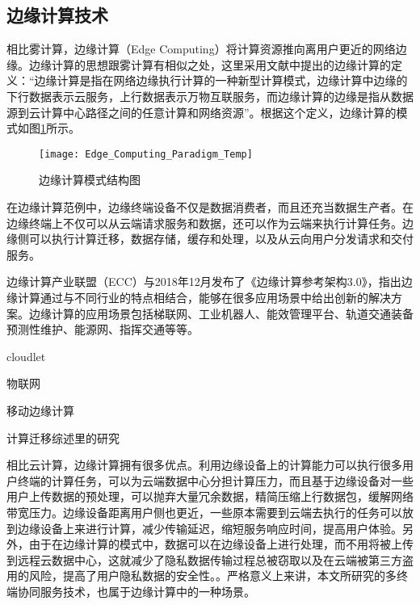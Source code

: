\subsection{边缘计算技术}

相比雾计算，边缘计算（Edge Computing）将计算资源推向离用户更近的网络边缘。边缘计算的思想跟雾计算有相似之处，这里采用文献\cite{施巍松2017边缘计算}中提出的边缘计算的定义：“边缘计算是指在网络边缘执行计算的一种新型计算模式，边缘计算中边缘的下行数据表示云服务，上行数据表示万物互联服务，而边缘计算的边缘是指从数据源到云计算中心路径之间的任意计算和网络资源”。根据这个定义，边缘计算的模式如图\ref{fig:edge_computing_paradigm}所示\cite{shi2016edge}。


\begin{figure}[!htbp]
    \centering
    \texttt{[image: Edge\_Computing\_Paradigm\_Temp]}
    \caption{边缘计算模式结构图}
    \label{fig:edge_computing_paradigm}
\end{figure}

在边缘计算范例中，边缘终端设备不仅是数据消费者，而且还充当数据生产者。在边缘终端上不仅可以从云端请求服务和数据，还可以作为云端来执行计算任务。边缘侧可以执行计算迁移，数据存储，缓存和处理，以及从云向用户分发请求和交付服务\cite{shi2016edge}。

边缘计算产业联盟（ECC）与2018年12月发布了《边缘计算参考架构3.0》\cite{边缘计算架构2018}，指出边缘计算通过与不同行业的特点相结合，能够在很多应用场景中给出创新的解决方案。边缘计算的应用场景包括梯联网、工业机器人、能效管理平台、轨道交通装备预测性维护、能源网、指挥交通等等。

cloudlet

物联网

移动边缘计算

计算迁移综述里的研究

相比云计算，边缘计算拥有很多优点\cite{赵梓铭2018边缘计算}。利用边缘设备上的计算能力可以执行很多用户终端的计算任务，可以为云端数据中心分担计算压力，而且基于边缘设备对一些用户上传数据的预处理，可以抛弃大量冗余数据，精简压缩上行数据包，缓解网络带宽压力。边缘设备距离用户侧也更近，一些原本需要到云端去执行的任务可以放到边缘设备上来进行计算，减少传输延迟，缩短服务响应时间，提高用户体验。另外，由于在边缘计算的模式中，数据可以在边缘设备上进行处理，而不用将被上传到远程云数据中心，这就减少了隐私数据传输过程总被窃取以及在云端被第三方盗用的风险，提高了用户隐私数据的安全性。。严格意义上来讲，本文所研究的多终端协同服务技术，也属于边缘计算中的一种场景。



